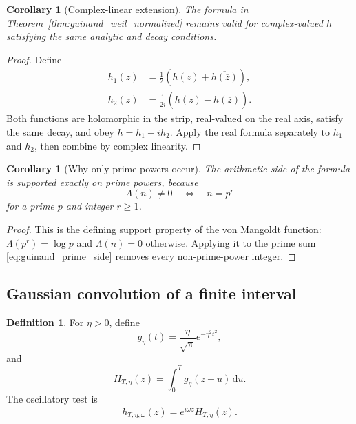 \documentclass[11pt]{amsart}
\numberwithin{equation}{section}
\theoremstyle{plain}
\newtheorem{corollary}[theorem]{Corollary}
\theoremstyle{definition}
\newtheorem{definition}[theorem]{Definition}
\theoremstyle{remark}
\newcommand{\1}{\mathbf{1}}
\newcommand{\dd}{\,\mathrm{d}}
\begin{document}
\begin{corollary}[Complex-linear extension]
\label{cor:guinand_complex_extension}
The formula in Theorem~\ref{thm:guinand_weil_normalized} remains valid
for complex-valued \(h\) satisfying the same analytic and decay
conditions.
\end{corollary}

\begin{proof}
Define
\begin{align}
h_1(z)
&=
\frac12\left(h(z)+\overline{h(\overline z)}\right),
\label{eq:complex_extension_h1}
\\
h_2(z)
&=
\frac1{2i}\left(h(z)-\overline{h(\overline z)}\right).
\label{eq:complex_extension_h2}
\end{align}
Both functions are holomorphic in the strip, real-valued on the real
axis, satisfy the same decay, and obey \(h=h_1+ih_2\).  Apply the real
formula separately to \(h_1\) and \(h_2\), then combine by complex
linearity.
\end{proof}

\begin{corollary}[Why only prime powers occur]
\label{cor:explicit_formula_prime_power_support}
The arithmetic side of the formula is supported exactly on prime powers,
because
\begin{equation}
\Lambda(n)\neq0
\quad\Longleftrightarrow\quad
n=p^r
\label{eq:von_mangoldt_support}
\end{equation}
for a prime \(p\) and integer \(r\geq1\).
\end{corollary}

\begin{proof}
This is the defining support property of the von Mangoldt function:
\(\Lambda(p^r)=\log p\) and \(\Lambda(n)=0\) otherwise.  Applying it to
the prime sum \eqref{eq:guinand_prime_side} removes every non-prime-power
integer.
\end{proof}

\subsection{Gaussian convolution of a finite interval}
\label{subsec:gaussian_convolution}

\begin{definition}
\label{def:gaussian_kernel_detailed}
For $\eta>0$, define
\begin{equation}
g_\eta(t)
=
\frac{\eta}{\sqrt\pi}e^{-\eta^2t^2},
\label{eq:gaussian_kernel_detailed}
\end{equation}
and
\begin{equation}
H_{T,\eta}(z)
=
\int_0^Tg_\eta(z-u)\dd u.
\label{eq:H_T_eta_detailed}
\end{equation}
The oscillatory test is
\begin{equation}
h_{T,\eta,\omega}(z)
=
e^{i\omega z}H_{T,\eta}(z).
\label{eq:h_T_eta_omega_detailed}
\end{equation}
\end{definition}
\end{document}
